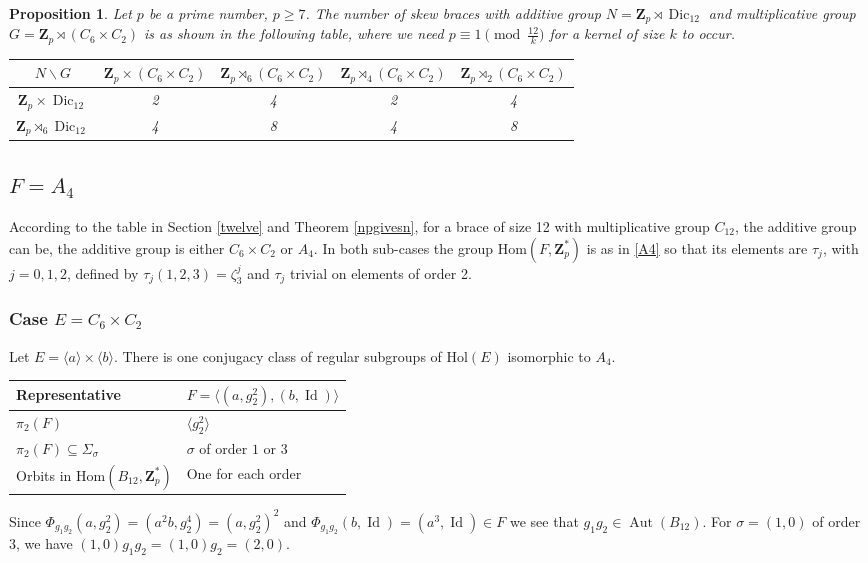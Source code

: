 \documentclass[12pt]{article}
\newtheorem{proposition}[theorem]{Proposition}
\theoremstyle{definition}
\newcommand{\Z}{\mathbf Z}
\newcommand{\Hol}{\mathrm{Hol}}
\newcommand{\Hom}{\mathrm{Hom}}
\newcommand{\Aut}{\operatorname{Aut}}
\newcommand{\Id}{\operatorname{Id}}
\newcommand{\Dic}{\operatorname{Dic}}
\begin{document}
\begin{proposition}
	Let $p$ be a prime number, $p\geq 7$.
	The number of skew braces with additive group $N=\Z_p \rtimes \Dic_{12}$ and multiplicative group $G=\Z_p\rtimes (C_6\times C_2)$ is as shown in the following table,
	where we need $p\equiv 1 \pmod{\frac {12}k}$ for a kernel of size $k$ to occur.
	
	\begin{center}
		\begin{tabular}{|c||c|c|c|c|}
			\hline
			$N \backslash G$ & $\Z_p\times (C_6\times C_2)$ & $\Z_p\rtimes_{6} (C_6\times C_2)$ & $\Z_p\rtimes_{4} (C_6\times C_2)$ & $\Z_p\rtimes_{2} (C_6\times C_2)$ \\
			\hline
			\hline
			$\Z_p\times \Dic_{12}$ &2&4&2&4\\
			\hline
			$\Z_p\rtimes_{6} \Dic_{12}$ &4&8&4&8\\
			\hline
		\end{tabular}
	\end{center}
\end{proposition}



\subsection{$F=A_4$}
According to the table in Section \ref{twelve} and Theorem \ref{npgivesn}, for a brace of size 12 with multiplicative group  $C_{12}$, the additive group can be, the additive group is either  $C_6\times C_2$ or $A_4$. In both sub-cases the group
$\Hom(F,\Z_p^*)$ is as in \ref{A4} so that its elements are $\tau_j$,  with $j=0,1,2$, defined by $\tau_j(1,2,3)=\zeta_3^j$ and $\tau_j$ trivial on elements of order 2.


\subsubsection*{Case $E=C_6 \times C_2$}

Let $E=\langle a\rangle \times \langle b \rangle$. There is 
one conjugacy class of regular subgroups of $\Hol(E)$ isomorphic to $A_4$.

\begin{center}
    \begin{tabular}{|l|l|}
    \hline
      Representative& $F=\langle (a,g_2^2),(b, \Id)\rangle$ \\
      \hline
      $\pi_2(F)$& $ \langle g_2^2\rangle $\\
      $\pi_2(F)\subseteq \Sigma_{\sigma}$ &  $\sigma$ of order $1$ or $3$ \\
      Orbits in $\Hom(B_{12},\Z_p^*)$ & One for each order\\
      \hline
    \end{tabular}
\end{center}    
Since $\Phi_{g_1g_2}(a,g_2^2)=(a^2b,g_2^4)=(a,g_2^2)^2$ and 
$\Phi_{g_1g_2}(b,\Id)=(a^3,\Id)\in F
$
we see that $g_1g_2\in\Aut(B_{12})$. For $\sigma=(1,0)$ of order $3$, we have $(1,0)g_1g_2=(1,0)g_2=(2,0)$.
\end{document}
